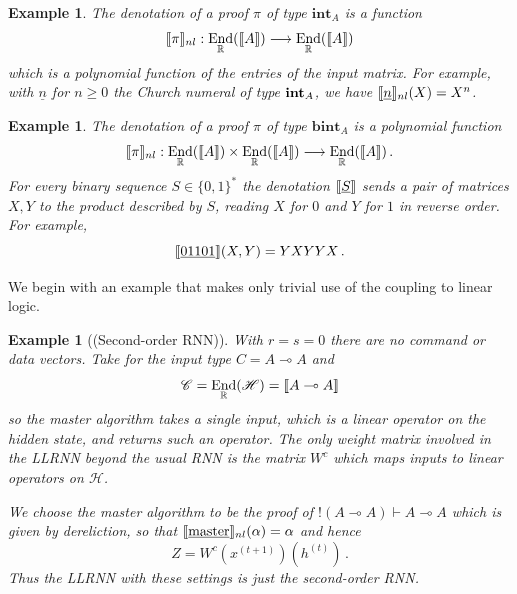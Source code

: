 \documentclass[english,letter paper,12pt,leqno]{article}
\theoremstyle{example}
\newtheorem{example}[theorem]{Example}
\newtheorem{remark}[theorem]{Remark}
\numberwithin{equation}{section}
\def\be{\begin{equation}}
\def\ee{\end{equation}}
\DeclareMathOperator{\End}{End}
\begin{document}
\begin{example}\label{example_1} The denotation of a proof $\pi$ of type $\textbf{int}_A$ is a function
\[
\den{\pi}_{nl}: \End_{\mathbb{R}}(\den{A}) \lto \End_{\mathbb{R}}(\den{A})
\]
which is a polynomial function of the entries of the input matrix. For example, with $\underline{n}$ for $n \ge 0$ the Church numeral of type $\textbf{int}_A$, we have $\llbracket \underline{n} \rrbracket_{nl}(X) = X^n$. %
\end{example}

\begin{example}\label{example_2} The denotation of a proof $\pi$ of type $\textbf{bint}_A$ is a polynomial function
\[
\den{\pi}_{nl}: \End_{\mathbb{R}}(\den{A}) \times \End_{\mathbb{R}}(\den{A}) \lto \End_{\mathbb{R}}(\den{A})\,.
\]
For every binary sequence $S \in \{0,1\}^*$ the denotation $\llbracket \underline{S} \rrbracket$ sends a pair of matrices $X,Y$ to the product described by $S$, reading $X$ for $0$ and $Y$ for $1$ in reverse order. For example,
\[
\llbracket \underline{01101} \rrbracket(X,Y) = Y X Y Y X\,.
\]
\end{example}


We begin with an example that makes only trivial use of the coupling to linear logic.

\begin{example}[(Second-order RNN)] With $r = s = 0$ there are no command or data vectors. Take for the input type $C = A \multimap A$ and
\[
\mathscr{C} = \End_{\mathbb{R}}(\mathscr{H}) = \den{A \multimap A}
\]
so the master algorithm takes a single input, which is a linear operator on the hidden state, and returns such an operator. The only weight matrix involved in the LLRNN beyond the usual RNN is the matrix $W^c$ which maps inputs to linear operators on $\mathscr{H}$.

We choose the master algorithm to be the proof of ${!}(A \multimap A) \vdash A \multimap A$ which is given by dereliction, so that $\llbracket \underline{\textup{master}} \rrbracket_{nl}(\alpha) = \alpha$ and hence
\be\label{eq:secondorderRNNinLLRNN}
Z = W^c(x^{(t+1)})(h^{(t)})\,.
\ee
Thus the LLRNN with these settings is just the second-order RNN.
\end{example}
\end{document}

